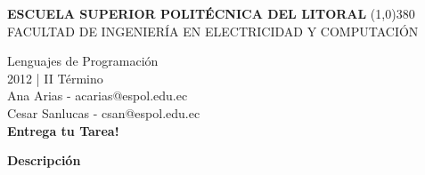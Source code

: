 \documentclass[12pt]{report}
\begin{document}
	\setlength{\topmargin}{-0.5in}
	\pagestyle{empty}
	\begin{center}
		\textbf{
			\vspace{-0.7em}
			ESCUELA SUPERIOR POLITÉCNICA DEL LITORAL
		}
		\line(1,0){380}\\		
		\scriptsize{FACULTAD DE INGENIERÍA EN ELECTRICIDAD Y COMPUTACIÓN}
	\end{center}
	\begin{center}
		\vspace{2.5em}
		Lenguajes de Programación
		\\2012 | II Término
		\vspace{1.5em}
		\\Ana Arias - acarias@espol.edu.ec
		\vspace{4mm}
		\\Cesar Sanlucas - csan@espol.edu.ec
		\vspace{2em}
		\Huge{\textbf{\\Entrega tu Tarea!	\vspace{1em}}}
	\end{center}	


	\begingroup
		\large{
			\textbf{
				Descripción
				\newline
				\newline
			}
		}
	\endgroup
\end{document}

